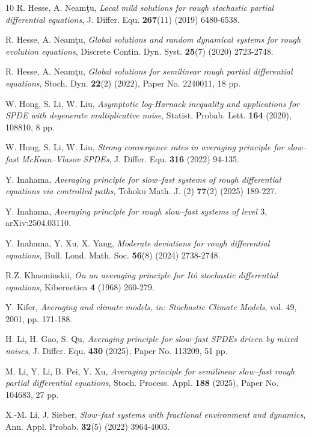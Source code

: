\documentclass[10pt,a4paper]{article}
\numberwithin{equation}{section}
\begin{document}
\begin{thebibliography}{10}
 R. Hesse, A. Neam\c{t}u, \emph{Local mild solutions for rough stochastic partial differential equations}, J. Differ. Equ. {\bf 267}(11) (2019) 6480-6538.

 R. Hesse, A. Neam\c{t}u, \emph{Global solutions and random dynamical systems for rough evolution equations},
Discrete Contin. Dyn. Syst. {\bf 25}(7) (2020) 2723-2748.


 R. Hesse, A. Neam\c{t}u, \emph{Global solutions for semilinear rough partial differential equations}, Stoch. Dyn. {\bf 22}(2) (2022), Paper No. 2240011, 18 pp.


 W. Hong, S. Li, W. Liu, \emph{Asymptotic log-Harnack inequality and applications for SPDE with degenerate multiplicative noise},
Statist. Probab. Lett. {\bf 164} (2020), 108810, 8 pp.



 W. Hong, S. Li, W. Liu, \emph{Strong convergence rates in averaging principle for slow--fast McKean--Vlasov SPDEs}, J. Differ. Equ. {\bf 316} (2022) 94-135.


 Y. Inahama, \emph{Averaging principle for slow--fast systems of rough differential equations via controlled paths}, Tohoku Math. J. (2) {\bf 77}(2) (2025) 189-227.


 Y. Inahama, \emph{Averaging principle for rough slow--fast systems of level $3$}, arXiv:2504.03110.


 Y. Inahama, Y. Xu, X. Yang, \emph{Moderate deviations for rough differential equations},
Bull. Lond. Math. Soc. {\bf 56}(8) (2024) 2738-2748.


 R.Z. Khasminskii, \emph{On an averaging principle for It\^{o} stochastic differential equations}, Kibernetica {\bf 4} (1968) 260-279.


 Y. Kifer, \emph{Averaging and climate models, in: Stochastic Climate Models}, vol. 49, 2001, pp. 171-188.


 H. Li, H. Gao, S. Qu, \emph{Averaging principle for slow--fast SPDEs driven by mixed noises}, J. Differ. Equ. {\bf 430} (2025), Paper No. 113209, 51 pp.


 M. Li, Y. Li, B. Pei, Y. Xu, \emph{Averaging principle for semilinear slow--fast rough partial differential equations}, Stoch. Process. Appl. {\bf 188} (2025), Paper No. 104683, 27 pp.


 X.-M. Li, J. Sieber, \emph{Slow--fast systems with fractional environment and dynamics}, Ann. Appl. Probab. {\bf 32}(5) (2022) 3964-4003.



\end{thebibliography}
\end{document}
